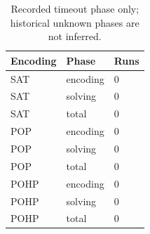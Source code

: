 \begin{table}[htbp]
\centering
\caption{Recorded timeout phase only; historical unknown phases are not inferred.}
\label{tab:p1-Repeated-exploratory-timeout-phases}
\begin{tabular}{lll}
\hline
Encoding & Phase & Runs \\
\hline
SAT & encoding & 0 \\
SAT & solving & 0 \\
SAT & total & 0 \\
POP & encoding & 0 \\
POP & solving & 0 \\
POP & total & 0 \\
POHP & encoding & 0 \\
POHP & solving & 0 \\
POHP & total & 0 \\
\hline
\end{tabular}
\end{table}
